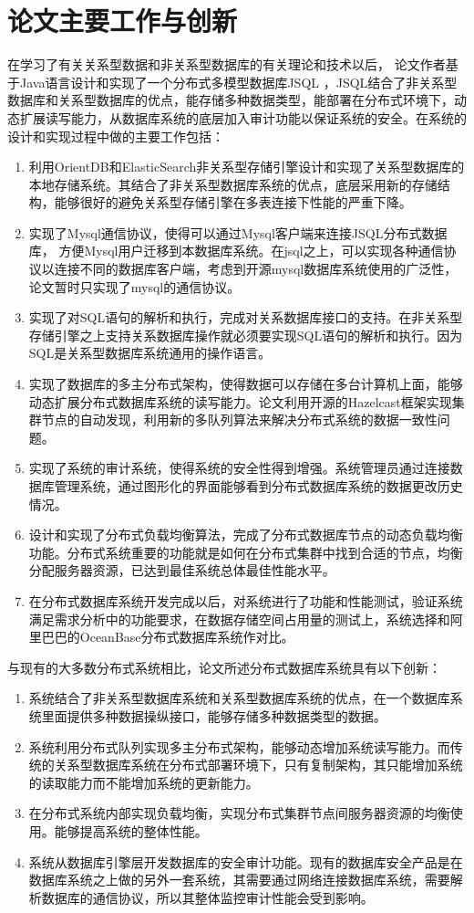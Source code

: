 \section{论文主要工作与创新}
在学习了有关关系型数据和非关系型数据库的有关理论和技术以后，
论文作者基于Java语言设计和实现了一个分布式多模型数据库JSQL
，JSQL结合了非关系型数据库和关系型数据库的优点，能存储多种数据类型，能部署在分布式环境下，动态扩展读写能力，从数据库系统的底层加入审计功能以保证系统的安全。在系统的设计和实现过程中做的主要工作包括：
\begin{enumerate}[fullwidth,itemindent=2em]
	\item 利用OrientDB和ElasticSearch非关系型存储引擎设计和实现了关系型数据库的本地存储系统。其结合了非关系型数据库系统的优点，底层采用新的存储结构，能够很好的避免关系型存储引擎在多表连接下性能的严重下降。
	\item 实现了Mysql通信协议，使得可以通过Mysql客户端来连接JSQL分布式数据库，
	方便Mysql用户迁移到本数据库系统。在jsql之上，可以实现各种通信协议以连接不同的数据库客户端，考虑到开源mysql数据库系统使用的广泛性，论文暂时只实现了mysql的通信协议。
	\item 实现了对SQL语句的解析和执行，完成对关系数据库接口的支持。在非关系型存储引擎之上支持关系数据库操作就必须要实现SQL语句的解析和执行。因为SQL是关系型数据库系统通用的操作语言。
	\item 实现了数据库的多主分布式架构，使得数据可以存储在多台计算机上面，能够动态扩展分布式数据库系统的读写能力。论文利用开源的Hazelcast框架实现集群节点的自动发现，利用新的多队列算法来解决分布式系统的数据一致性问题。
	\item 实现了系统的审计系统，使得系统的安全性得到增强。系统管理员通过连接数据库管理系统，通过图形化的界面能够看到分布式数据库系统的数据更改历史情况。
	\item 设计和实现了分布式负载均衡算法，完成了分布式数据库节点的动态负载均衡功能。分布式系统重要的功能就是如何在分布式集群中找到合适的节点，均衡分配服务器资源，已达到最佳系统总体最佳性能水平。
	\item 在分布式数据库系统开发完成以后，对系统进行了功能和性能测试，验证系统满足需求分析中的功能要求，在数据存储空间占用量的测试上，系统选择和阿里巴巴的OceanBase分布式数据库系统作对比。
\end{enumerate}


与现有的大多数分布式系统相比，论文所述分布式数据库系统具有以下创新：
\begin{enumerate}[fullwidth,itemindent=2em]
	\item 系统结合了非关系型数据库系统和关系型数据库系统的优点，在一个数据库系统里面提供多种数据操纵接口，能够存储多种数据类型的数据。
	\item 系统利用分布式队列实现多主分布式架构，能够动态增加系统读写能力。而传统的关系型数据库系统在分布式部署环境下，只有复制架构，其只能增加系统的读取能力而不能增加系统的更新能力。
	\item 在分布式系统内部实现负载均衡，实现分布式集群节点间服务器资源的均衡使用。能够提高系统的整体性能。
	\item 系统从数据库引擎层开发数据库的安全审计功能。现有的数据库安全产品是在数据库系统之上做的另外一套系统，其需要通过网络连接数据库系统，需要解析数据库的通信协议，所以其整体监控审计性能会受到影响。
\end{enumerate}
